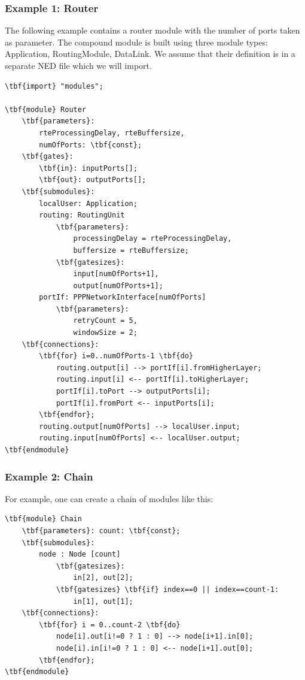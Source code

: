 \subsubsection{Example 1: Router}

The following example contains a router module with the number of
ports taken as parameter. The compound module is built using three
module types: Application, RoutingModule, DataLink. We assume that
their definition is in a separate NED file which we will import.

\begin{Verbatim}[commandchars=\\\{\}]
\tbf{import} "modules";

\tbf{module} Router
    \tbf{parameters}:
        rteProcessingDelay, rteBuffersize,
        numOfPorts: \tbf{const};
    \tbf{gates}:
        \tbf{in}: inputPorts[];
        \tbf{out}: outputPorts[];
    \tbf{submodules}:
        localUser: Application;
        routing: RoutingUnit
            \tbf{parameters}:
                processingDelay = rteProcessingDelay,
                buffersize = rteBuffersize;
            \tbf{gatesizes}:
                input[numOfPorts+1],
                output[numOfPorts+1];
        portIf: PPPNetworkInterface[numOfPorts]
            \tbf{parameters}:
                retryCount = 5,
                windowSize = 2;
    \tbf{connections}:
        \tbf{for} i=0..numOfPorts-1 \tbf{do}
            routing.output[i] --> portIf[i].fromHigherLayer;
            routing.input[i] <-- portIf[i].toHigherLayer;
            portIf[i].toPort --> outputPorts[i];
            portIf[i].fromPort <-- inputPorts[i];
        \tbf{endfor};
        routing.output[numOfPorts] --> localUser.input;
        routing.input[numOfPorts] <-- localUser.output;
\tbf{endmodule}
\end{Verbatim}


\subsubsection{Example 2: Chain}


For example, one can create a chain of modules like this:

\begin{Verbatim}[commandchars=\\\{\}]
\tbf{module} Chain
    \tbf{parameters}: count: \tbf{const};
    \tbf{submodules}:
        node : Node [count]
            \tbf{gatesizes}:
                in[2], out[2];
            \tbf{gatesizes} \tbf{if} index==0 || index==count-1:
                in[1], out[1];
    \tbf{connections}:
        \tbf{for} i = 0..count-2 \tbf{do}
            node[i].out[i!=0 ? 1 : 0] --> node[i+1].in[0];
            node[i].in[i!=0 ? 1 : 0] <-- node[i+1].out[0];
        \tbf{endfor};
\tbf{endmodule}
\end{Verbatim}



